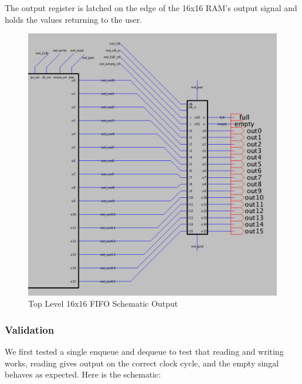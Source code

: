 \documentclass[a4paper]{article}
\begin{document}
The output register is latched on the edge of the 16x16 RAM's output signal and holds the values returning to the user.

\begin{figure}[H]
	\centering
	\includegraphics[scale=0.4]{topLevelSchematicRight}
	\caption{Top Level 16x16 FIFO Schematic Output}
	\label{fig:topLevelSchematicRight}
\end{figure}

\subsubsection{Validation}

We first tested a single enqueue and dequeue to test that reading and writing works, reading gives output on the correct clock cycle, and the empty singal behaves as expected. Here is the schematic:
\end{document}
